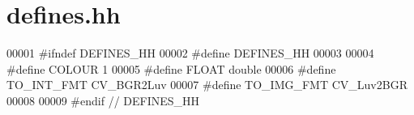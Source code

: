 \hypertarget{defines_8hh_source}{
\section{defines.hh}
}

\begin{DoxyCode}
00001 \textcolor{preprocessor}{#ifndef DEFINES\_HH}
00002 \textcolor{preprocessor}{}\textcolor{preprocessor}{#define DEFINES\_HH}
00003 \textcolor{preprocessor}{}
00004 \textcolor{preprocessor}{#define COLOUR 1}
00005 \textcolor{preprocessor}{}\textcolor{preprocessor}{#define FLOAT double}
00006 \textcolor{preprocessor}{}\textcolor{preprocessor}{#define TO\_INT\_FMT CV\_BGR2Luv}
00007 \textcolor{preprocessor}{}\textcolor{preprocessor}{#define TO\_IMG\_FMT CV\_Luv2BGR}
00008 \textcolor{preprocessor}{}
00009 \textcolor{preprocessor}{#endif  // DEFINES\_HH}
\end{DoxyCode}
